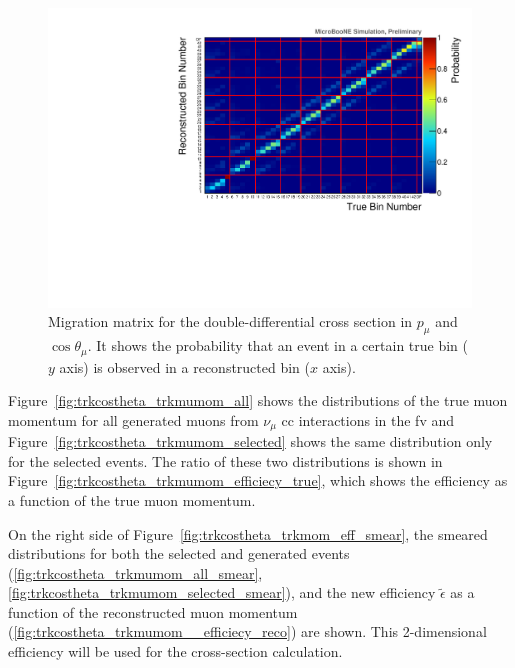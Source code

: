 \begin{figure}[]
\centering
\includegraphics[width=1.0\textwidth]{images/XSecPmuCosThetaMu/full_migration_matrix_4d_poly}
\caption[Migration Matrix for the Double-Differential Cross Section]{Migration matrix for the double-differential cross section in $p_\mu$ and $\cos\theta_\mu$. It shows the probability that an event in a certain true bin ($y$ axis) is observed in a reconstructed bin ($x$ axis).}
\label{fig:full_migration_matrix_4d}
\end{figure}

Figure~\ref{fig:trkcostheta_trkmumom_all} shows the distributions of the true muon momentum for all generated muons from $\nu_\mu$ \acrshort{cc} interactions in the \acrshort{fv} and Figure~\ref{fig:trkcostheta_trkmumom_selected}  shows the same distribution only for the selected events. The ratio of these two distributions is shown in Figure~\ref{fig:trkcostheta_trkmumom_efficiecy_true}, which shows the efficiency as a function of the true muon momentum. 

On the right side of Figure~\ref{fig:trkcostheta_trkmom_eff_smear}, the smeared distributions for both the selected and generated events (\ref{fig:trkcostheta_trkmumom_all_smear}, \ref{fig:trkcostheta_trkmumom_selected_smear}), and the new efficiency $\tilde{\epsilon}$ as a function of the reconstructed muon momentum (\ref{fig:trkcostheta_trkmumom__efficiecy_reco}) are shown. This 2-dimensional efficiency will be used for the cross-section calculation.

